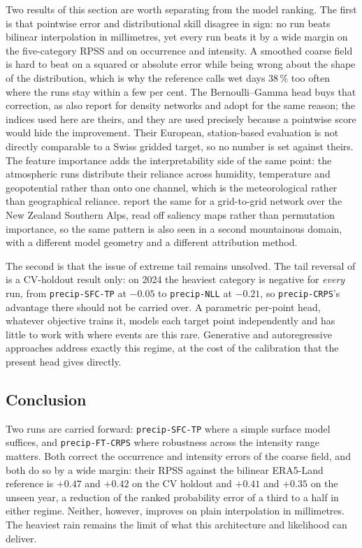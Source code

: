 Two results of this section are worth separating from the model ranking. The first is that pointwise
error and distributional skill disagree in sign: no run beats bilinear interpolation in millimetres,
yet every run beats it by a wide margin on the five-category RPSS and on occurrence and intensity.
A smoothed coarse field is hard to beat on a squared
or absolute error while being wrong about the shape of the distribution, which is why the reference
calls wet days $38\,\%$ too often where the runs stay within a few per cent. The Bernoulli--Gamma
head buys that correction, as \textcite{cannon2008berngamma} also report for density networks and
\textcite{vaughan2022convcnp} adopt for the same reason; the indices used here are theirs, and they
are used precisely because a pointwise score would hide the improvement. Their European,
station-based evaluation is not directly comparable to a Swiss gridded target, so no number is set
against theirs. The feature importance adds the interpretability side of the same point: the
atmospheric runs distribute their reliance across humidity, temperature and geopotential rather than
onto one channel, which is the meteorological rather than geographical reliance. \textcite{rampal2022interpretable} report the same for a grid-to-grid network over the New Zealand Southern Alps, read off saliency maps rather than permutation importance, so the same pattern is also seen in a second mountainous domain, with a different model geometry and a different attribution method.

The second is that the issue of extreme tail remains unsolved. The tail reversal of
 is a CV-holdout result only: on 2024 the heaviest category is
negative for \emph{every} run, from \texttt{precip-SFC-TP} at $-0.05$ to \texttt{precip-NLL} at
$-0.21$, so \texttt{precip-CRPS}'s advantage there should not be carried over. A parametric
per-point head, whatever objective trains it, models each target point independently and has little
to work with where events are this rare. Generative and autoregressive approaches
\cite{harris2022generative, mardani2025corrdiff, bruinsma2023arcnp} address exactly this regime, at
the cost of the calibration that the present head gives directly.



\subsection{Conclusion}\label{subsec:single-precip-conclusion}

Two runs are carried forward: \texttt{precip-SFC-TP} where a simple surface model suffices, and
\texttt{precip-FT-CRPS} where robustness across the intensity range matters. Both correct the
occurrence and intensity errors of the coarse field, and both do so by a wide margin: their RPSS
against the bilinear ERA5-Land reference is $+0.47$ and $+0.42$ on the CV holdout and $+0.41$ and
$+0.35$ on the unseen year, a reduction of the ranked probability error of a third to a half in
either regime. Neither, however, improves on plain interpolation in millimetres. The heaviest rain remains the limit of what
this architecture and likelihood can deliver. 

